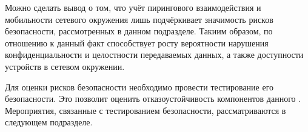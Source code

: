 %
Можно сделать вывод о том, что учёт пирингового взаимодействия и мобильности сетевого окружения лишь подчёркивает значимость рисков безопасности, рассмотренных в данном подразделе. 
%
Такиим образом, по отношению к \PeerHood данный факт способствует росту вероятности нарушения конфиденциальности и целостности передаваемых данных, а также доступности устройств в сетевом окружении. 

%
Для оценки рисков безопасности \PeerHood необходимо провести тестирование его безопасности. 
%
Это позволит оценить отказоустойчивость компонентов данного . 
%
Мероприятия, связанные с тестированием безопасности, рассматриваются в следующем подразделе. 